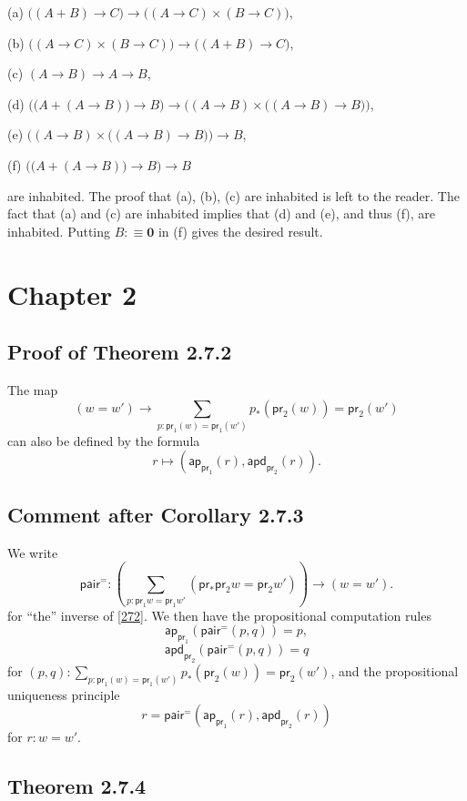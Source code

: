 \documentclass[12pt]{article}
\newcommand{\mbf}{\mathbf}
\newcommand{\ap}{\mathsf{ap}}
\newcommand{\apd}{\mathsf{apd}}
\newcommand{\nn}{\noindent}
\newcommand{\pa}{\mathsf{pair}^=}
\newcommand{\pr}{\mathsf{pr}}
\begin{document}
(a) $\big((A+B)\to C\big)\to\big((A\to C)\times(B\to C)\big)$,

(b) $\big((A\to C)\times(B\to C)\big)\to\big((A+B)\to C\big)$,

(c) $(A\to B)\to A\to B$,

(d) $\Big(\big(A+(A\to B)\big)\to B\Big)\to\Big((A\to B)\times\big((A\to B)\to B\big)\Big)$, 

(e) $\Big((A\to B)\times\big((A\to B)\to B\big)\Big)\to B$,

(f) $\Big(\big(A+(A\to B)\big)\to B\Big)\to B$

\nn are inhabited. The proof that (a), (b), (c) are inhabited is left to the reader. The fact that (a) and (c) are inhabited implies that (d) and (e), and thus (f), are inhabited. Putting $B:\equiv\mbf0$ in (f) gives the desired result.


\section{Chapter 2}

\subsection{Proof of Theorem 2.7.2}

The map 
\begin{equation}\label{272}
(w=w')\to\sum_{p:\pr_1(w)=\pr_1(w')}p_*(\pr_2(w))=\pr_2(w')
\end{equation}
can also be defined by the formula 
$$
r\mapsto(\ap_{\pr_1}(r),\apd_{\pr_2}(r)).
$$


\subsection{Comment after Corollary 2.7.3}

We write 
$$
\pa:\left(\sum_{p:\pr_1w=\pr_1w'}(\pr_*\pr_2w=\pr_2w')\right)\to(w=w').
$$ 
for ``the'' inverse of \eqref{272}. We then have the propositional computation rules 
$$
\ap_{\pr_1}(\pa(p,q))=p,
$$
$$
\apd_{\pr_2}(\pa(p,q))=q
$$
for $(p,q):\sum_{p:\pr_1(w)=\pr_1(w')}p_*(\pr_2(w))=\pr_2(w')$, and the propositional uniqueness principle 
$$
r=\pa(\ap_{\pr_1}(r),\apd_{\pr_2}(r))
$$ 
for $r:w=w'$.


\subsection{Theorem 2.7.4}\label{274}
\end{document}
